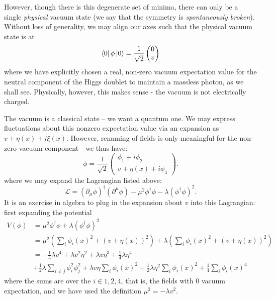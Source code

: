 However, though there is this degenerate set of minima, there can only be a single \emph{physical} vacuum state 
(we say that the symmetry is \emph{spontaneously broken}). Without loss of generality, we may align our 
axes such that the physical vacuum state is at 
\begin{equation}
\bra{0}\phi\ket{0} = \frac{1}{\sqrt{2}}\begin{pmatrix}0\\v\end{pmatrix}
\end{equation}
where we have explicitly chosen a real, non-zero vacuum expectation value for the neutral component of the Higgs 
doublet to maintain a massless photon, as we shall see. Physically, however, this makes sense - the 
vacuum is not electrically charged. 

The vacuum is a classical state -- we want a quantum one. We may express fluctuations about this 
nonzero expectation value via an expansion as $v+\eta(x)+i\xi(x)$. However, renaming of 
fields is only meaningful for the non-zero vacuum component - we thus have:
\begin{equation}
\phi = \frac{1}{\sqrt{2}}\begin{pmatrix}\phi_1+i\phi_2\\v+\eta(x)+i\phi_4\end{pmatrix}.
\end{equation}
where we may expand the Lagrangian listed above:
\begin{equation}
\mathcal{L} = (\partial_{\mu}\phi)^{\dagger}(\partial^{\mu}\phi) -\mu^2\phi^{\dagger}\phi - \lambda(\phi^{\dagger}\phi)^2.
\end{equation}
It is an exercise in algebra to plug in the expansion about $v$ into this Lagrangian: first expanding the potential
\begin{align}
V(\phi) &= \mu^2\phi^{\dagger}\phi + \lambda(\phi^{\dagger}\phi)^2\\
&= \mu^2(\sum\limits_{i} \phi_i(x)^2 + (v+\eta(x))^2) + \lambda(\sum\limits_{i} \phi_i(x)^2 + (v+\eta(x))^2)\\
&= -\frac{1}{4}\lambda v^4 + \lambda v^2\eta^2 + \lambda v \eta^3 + \frac{1}{4}\lambda\eta^4\\
&  +\frac{1}{2} \lambda \sum\limits_{i\neq j}\phi_i^2\phi_j^2+ \lambda v\eta\sum\limits_{i}\phi_i(x)^2+\frac{1}{2}\lambda\eta^2\sum\limits_{i}\phi_i(x)^2 + \frac{1}{4}\sum\limits_{i}\phi_i(x)^4
\end{align}
where the sums are over the $i\in {1,2,4}$, that is, the fields with $0$ vacuum expectation, and we have used
the definition $\mu^2=-\lambda v^2$.

